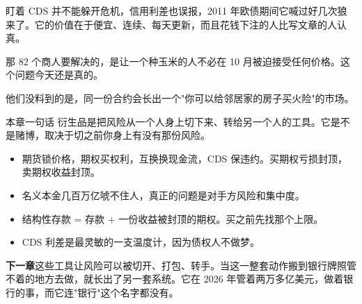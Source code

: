 盯着 CDS 并不能躲开危机，信用利差也误报，2011 年欧债期间它喊过好几次狼来了。它的价值在于便宜、连续、每天更新，而且花钱下注的人比写文章的人认真。

\bookbreak

那 82 个商人要解决的，是让一个种玉米的人不必在 10 月被迫接受任何价格。这个问题今天还是真的。

他们没料到的是，同一份合约会长出一个"你可以给邻居家的房子买火险"的市场。

\begin{takeaway}{本章一句话}
衍生品是把风险从一个人身上切下来、转给另一个人的工具。它是不是赌博，取决于切之前你身上有没有那份风险。

\begin{itemize}
  \item 期货锁价格，期权买权利，互换换现金流，CDS 保违约。买期权亏损封顶，卖期权收益封顶。
  \item 名义本金几百万亿唬不住人，真正的问题是对手方风险和集中度。
  \item 结构性存款 = 存款 + 一份收益被封顶的期权。买之前先找那个上限。
  \item CDS 利差是最灵敏的一支温度计，因为债权人不做梦。
\end{itemize}

\end{takeaway}

\begin{bridgebox}
\textbf{下一章}这些工具让风险可以被切开、打包、转手。当这一整套动作搬到银行牌照管不着的地方去做，就长出了另一套系统。它在 2026 年管着两万多亿美元，做着银行的事，而它连"银行"这个名字都没有。
\end{bridgebox}


